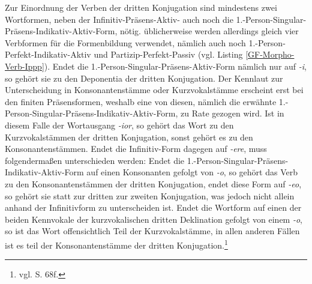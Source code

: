 Zur Einordnung der Verben der dritten Konjugation sind mindestens zwei Wortformen, neben der Infinitiv-Präsens-Aktiv- auch noch die 1.-Person-Singular-Präsens-Indikativ-Aktiv-Form, nötig. üblicherweise werden allerdings gleich vier Verbformen für die Formenbildung verwendet, nämlich auch noch 1.-Per\-son-Per\-fekt-In\-di\-ka\-tiv-Ak\-tiv und Par\-ti\-zip-Per\-fekt-Pas\-siv (vgl. Listing \ref{GF-Morpho-Verb-Ippp}). Endet die 1.-Per\-son-Sin\-gu\-lar-Prä\-sens-Ak\-tiv-Form nämlich nur auf \textit{-i}, so gehört sie zu den Deponentia der dritten Konjugation. Der Kennlaut zur Unterscheidung in Konsonantenstämme oder Kurzvokalstämme erscheint erst bei den finiten Präsensformen, weshalb eine von diesen, nämlich die erwähnte 1.-Person-Singular-Präsens-Indikativ-Aktiv-Form, zu Rate gezogen wird. Ist in diesem Falle der Wortausgang \textit{-ior}, so gehört das Wort zu den Kurzvokalstämmen der dritten Konjugation, sonst gehört es zu den Konsonantenstämmen. Endet die Infinitiv-Form dagegen auf \textit{-ere}, muss folgendermaßen unterschieden werden: Endet die 1.-Person-Singular-Präsens-Indikativ-Aktiv-Form auf einen Konsonanten gefolgt von \textit{-o}, so gehört das Verb zu den Konsonantenstämmen der dritten Konjugation, endet diese Form auf \textit{-eo}, so gehört sie statt zur dritten zur zweiten Konjugation, was jedoch nicht allein anhand der Infinitivform zu unterscheiden ist. Endet die Wortform auf einen der beiden Kennvokale der kurzvokalischen dritten Deklination gefolgt von einem \textit{-o}, so ist das Wort offensichtlich Teil der Kurzvokalstämme, in allen anderen Fällen ist es teil der Konsonantenstämme der dritten Konjugation.\footnote{vgl. \cite{BAYER-LINDAUER1994} S. 68f.} \par
\FloatBarrier
